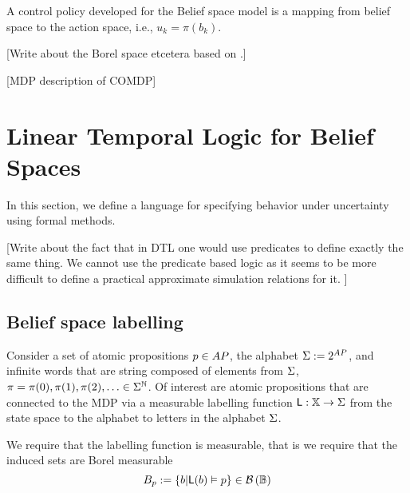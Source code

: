 \documentclass{ifacconf}
\newcommand{\red}[1]{{\color{red} #1}}
\begin{document}
A control policy developed for the Belief space model is a mapping from belief space to the action space, i.e., $u_k=\pi(b_k)$. 

\red{[Write about the Borel space etcetera based on \cite{bertsekas2004stochastic}.]}



\red{[MDP description of COMDP]}

 

\section{Linear Temporal Logic for Belief Spaces}

	In this section, we define a language for specifying behavior under uncertainty using formal methods. 
	
	
	\red{[Write about the fact that in DTL one would use predicates to define exactly the same thing. We cannot use the predicate based logic as it seems to be more difficult to define a practical approximate simulation relations for it. ]}
	
    
    
	\subsection{Belief space labelling}\label{sec:DTL}  
Consider a set of atomic propositions $p\in AP$, the alphabet $\Sigma := 2^{AP}$, and
infinite words that are string composed of elements from $\Sigma$, $\pi=\pi(0),\pi(1),\pi(2),\ldots\in\Sigma^{\mathbb{N}}$.
Of interest are atomic propositions that are connected to the MDP via a measurable labelling function $\mathsf{L}:\mathbb X\rightarrow \Sigma$ from the state space to the alphabet to letters in the alphabet $\Sigma$. 

%
     We require that the labelling function is measurable, that is we require that the induced sets  are Borel measurable
     \[B_p:=\{b|\mathsf{L}(b)\vDash p \}\in \mathcal{B}\left(\mathbb B\right)\] 
     
\end{document}
